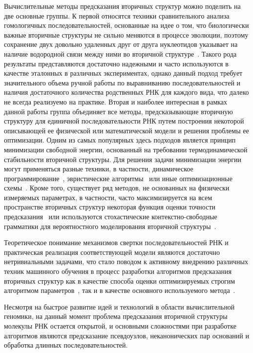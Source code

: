 Вычислительные методы предсказания вторичных структур можно поделить на две основные группы. К первой относятся техники сравнительного анализа гомологичных последовательностей, основанные на идее о том, что биологически важные вторичные структуры не сильно меняются в процессе эволюции, поэтому сохранение двух довольно удаленных друг от друга нуклеотидов указывает на наличие водородной связи между ними во вторичной структуре~\cite{gutell2002accuracy,chen1999rna}. Такого рода результаты представляются достаточно надежными и часто используются в качестве эталонных в различных экспериментах, однако данный подход требует значительного объема ручной работы по выравниванию последовательностей и наличия достаточного количества родственных РНК для каждого вида, что далеко не всегда реализуемо на практике. Вторая и наиболее интересная в рамках данной работы группа объединяет все методы, предсказывающие вторичную структуру для единичной последовательности РНК путем построения некоторой описывающей ее физической или математической модели и решения проблемы ее оптимизации. 
Одним из самых популярных здесь подходов является принцип минимизации свободной энергии, основанный на требовании термодинамической стабильности вторичной структуры. Для решения задачи минимизации энергии могут применяться разные техники, в частности, динамическое программирование~\cite{bellaousov2013rnastructure,rivas1999dynamic}, эвристические алгоритмы~\cite{ren2005hotknots,ruan2004ilm} или иные оптимизационные схемы~\cite{reeder2007pknotsrg, jabbari2018knotty}. Кроме того, существует ряд методов, не основанных на физически измеряемых параметрах, в частности, часто максимизируется на всем пространстве вторичных структур некоторая функция оценки точности предсказания~\cite{hamada2009prediction,sato2009centroidfold} или используются стохастические контекстно-свободные грамматики для вероятностного моделирования вторичной структуры~\cite{knudsen1999rna,dowell2004evaluation}. 

Теоретическое понимание механизмов свертки последовательностей РНК и практическая реализация соответствующей модели являются достаточно нетривиальными задачами, что стало поводом к активному внедрению различных техник машинного обучения в процесс разработки алгоритмов предсказания вторичных структур как в качестве способа оценки оптимизируемых строгим алгоритмом параметров~\cite{akiyama2018max,do2006contrafold}, так и в качестве основного используемого метода~\cite{singh2019rna,apolloni2003rna}.

Несмотря на быстрое развитие идей и технологий в области вычислительной геномики, на данный момент проблема предсказания вторичной структуры молекулы РНК остается открытой, и основными сложностями при разработке алгоритмов являются предсказание псевдоузлов, неканонических пар оснований и обработка длинных последовательностей.

